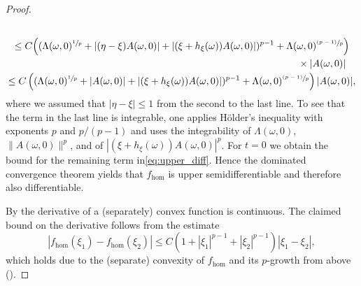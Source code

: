 \documentclass[JEP,XML,SOM,Unicode,published]{cedram}
\newcommand{\psfrac}[2]{\sfrac{(#1)}{#2}}
\theoremstyle{definition}
\let\w\omega
\begin{document}
\begin{proof}
\begin{multline*}
\\
\leq C \Bigl((\Lambda(\w,0)^{\sfrac{1}{p}}+|(\eta-\xi)A(\w,0)|+|(\xi+h_{\xi}(\w))A(\w,0)|)^{p-1}+\Lambda(\w,0)^{\psfrac{p-1}{p}}\Bigr)\\
\shoveright{{}\times|A(\w,0)|}
\\
\leq C \left((\Lambda(\w,0)^{\sfrac{1}{p}}+|A(\w,0)|+|(\xi+h_{\xi}(\w))A(\w,0)|)^{p-1}+\Lambda(\w,0)^{\psfrac{p-1}{p}}\right)|A(\w,0)|,
\end{multline*}
where we assumed that $|\eta-\xi|\leq 1$ from the second to the last line.
To see that the term in the last line is integrable, one applies Hölder's inequality with exponents $p$ and $p/(p-1)$ and uses the integrability of $\Lambda(\w,0)$, $\|A(\w,0)\|^p$, and of $|(\xi+h_{\xi}(\w))A(\w,0)|^p$. For $t=0$ we obtain the bound for the remaining term in\eqref{eq:upper_diff}. Hence the dominated convergence theorem yields that $f_{\hom}$ is upper semidifferentiable and therefore also differentiable.

By \cite[Th.\,4.65]{FoLe} the derivative of a (separately) convex function is continuous. The claimed bound on the derivative follows from the estimate
\begin{equation*}
|f_{\hom}(\xi_1)-f_{\hom}(\xi_2)|\leq C(1+|\xi_1|^{p-1}+|\xi_2|^{p-1})|\xi_1-\xi_2|,
\end{equation*}
which holds due to the (separate) convexity of $f_{\hom}$ and its $p$-growth from above (\cf \cite[Prop.\,4.64]{FoLe}).
\end{proof}
\end{document}
